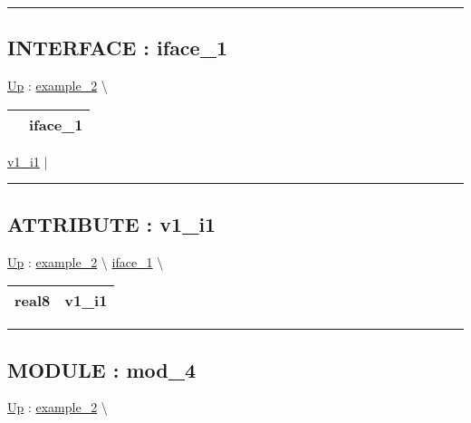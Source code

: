 \par


\rule{\linewidth}{0.5pt}


\subsection*{INTERFACE : iface\_1}
\hypertarget{ecldoc:example_2.iface_1}{}
\hyperlink{ecldoc:example_2}{Up} :
\hspace{0pt} \hyperlink{ecldoc:example_2}{example_2} \textbackslash 

{\renewcommand{\arraystretch}{1.5}
\begin{tabularx}{\textwidth}{|>{\raggedright\arraybackslash}l|X|}
\hline
\hspace{0pt} & iface\_1 \\
\hline
\end{tabularx}
}

\par


\hyperlink{ecldoc:example_2.iface_1.v1_i1}{v1\_i1}  |

\rule{\linewidth}{0.5pt}

\subsection*{ATTRIBUTE : v1\_i1}
\hypertarget{ecldoc:example_2.iface_1.v1_i1}{}
\hyperlink{ecldoc:example_2.iface_1}{Up} :
\hspace{0pt} \hyperlink{ecldoc:example_2}{example_2} \textbackslash 
\hspace{0pt} \hyperlink{ecldoc:example_2.iface_1}{iface_1} \textbackslash 

{\renewcommand{\arraystretch}{1.5}
\begin{tabularx}{\textwidth}{|>{\raggedright\arraybackslash}l|X|}
\hline
\hspace{0pt}real8 & v1\_i1 \\
\hline
\end{tabularx}
}

\par


\rule{\linewidth}{0.5pt}


\subsection*{MODULE : mod\_4}
\hypertarget{ecldoc:example_2.mod_4}{}
\hyperlink{ecldoc:example_2}{Up} :
\hspace{0pt} \hyperlink{ecldoc:example_2}{example_2} \textbackslash 

